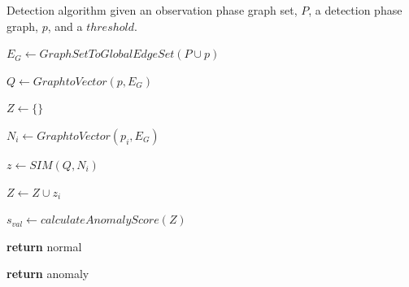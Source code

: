\begin{algorithm}[h!]

\caption{Detection algorithm given an observation phase graph set, $P$, a detection phase graph, $p$, and a $threshold$.} 
 \label{alg:graph_anomaly} 

\begin{algorithmic}[1]  


\State $E_G \gets GraphSetToGlobalEdgeSet(P \cup p)$

\State $Q \gets GraphtoVector(p, E_G)$ 

\State $Z \gets \{\}$

\State $N_i \gets GraphtoVector(p_i, E_G)$

\State $z \gets SIM(Q, N_i)$

\State $Z \gets Z \cup z_i$

\EndFor	

\State $s_{val} \gets calculateAnomalyScore(Z)$

\State \textbf{return} normal

\EndIf

\State \textbf{return} anomaly
\EndProcedure



\end{algorithmic}



\end{algorithm}



%
%
%
%
%
%
%
%
%
%
%
%
%
%






